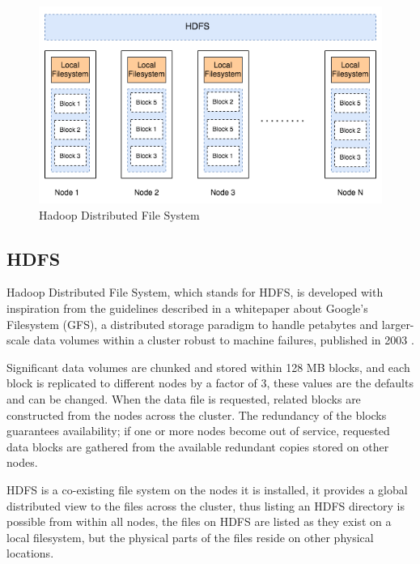 \documentclass[review]{elsarticle}
\begin{document}
	
	\begin{figure}[h!]
		\caption{Hadoop Distributed File System}
		\label{fig:HDFSoverview}
		\includegraphics[width=\textwidth]{HDFSoverview}
		\centering
	\end{figure}
	
	\subsection{HDFS}\label{HDFS}
	Hadoop Distributed File System, which stands for HDFS, is developed with inspiration from the guidelines described in a whitepaper about Google's Filesystem (GFS), a distributed storage paradigm to handle petabytes and larger-scale data volumes within a cluster robust to machine failures, published in 2003 \cite{ghemawat_google_2003}. 
	
	Significant data volumes are chunked and stored within 128 MB blocks, and each block is replicated to different nodes by a factor of 3, these values are the defaults and can be changed. When the data file is requested, related blocks are constructed from the nodes across the cluster. The redundancy of the blocks guarantees availability; if one or more nodes become out of service, requested data blocks are gathered from the available redundant copies stored on other nodes. 
	
	HDFS is a co-existing file system on the nodes it is installed, it provides a global distributed view to the files across the cluster, thus listing an HDFS directory is possible from within all nodes, the files on HDFS are listed as they exist on a local filesystem, but the physical parts of the files reside on other physical locations. 
	
\end{document}
